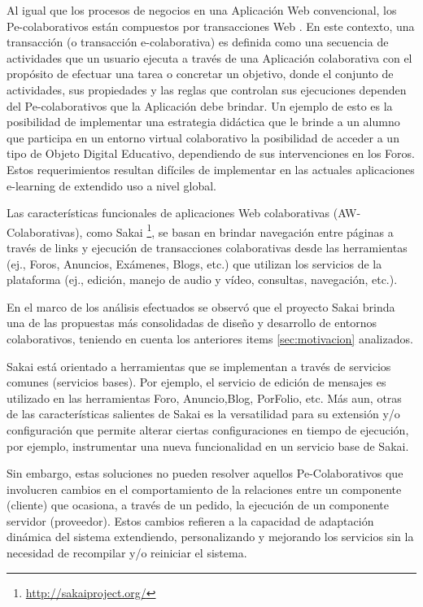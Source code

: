 {Al igual que los procesos de negocios en una Aplicación Web
convencional, los Pe-colaborativos están compuestos por transacciones Web
\cite{cacic2007.7}. En este contexto, una transacción (o transacción
e-colaborativa) es definida como una secuencia de actividades que un usuario
ejecuta a través de una Aplicación colaborativa con el propósito de efectuar una
tarea o concretar un objetivo, donde el conjunto de actividades, sus propiedades
y las reglas que controlan sus ejecuciones dependen del Pe-colaborativos que la
Aplicación debe brindar. Un ejemplo de esto es la posibilidad de implementar una estrategia didáctica que le brinde a un alumno que participa en un entorno virtual colaborativo la posibilidad de acceder a un tipo de Objeto Digital Educativo, dependiendo de sus intervenciones en los Foros. 
Estos requerimientos resultan difíciles de implementar en las actuales aplicaciones e-learning de
extendido uso a nivel global.

Las características funcionales de aplicaciones Web
colaborativas (AW-Colaborativas), como
Sakai \footnote{\url{http://sakaiproject.org/}}, se basan en brindar
navegación entre páginas a través de links y ejecución de transacciones
colaborativas  desde las herramientas (ej., Foros, Anuncios, Exámenes, Blogs,
etc.) que utilizan los servicios de la plataforma (ej., edición, manejo de audio
y vídeo, consultas, navegación, etc.).

En el marco de los análisis efectuados se observó que el proyecto Sakai
brinda una de las propuestas más consolidadas de diseño y desarrollo de
entornos colaborativos, teniendo en cuenta los anteriores items
\ref{sec:motivacion} analizados.

Sakai está orientado a herramientas que se implementan a través de servicios
comunes (servicios bases). Por ejemplo, el servicio de edición de mensajes es
utilizado en las herramientas Foro, Anuncio,Blog, PorFolio, etc. Más aun, otras
de las características salientes de Sakai es la versatilidad para su extensión
y/o configuración que permite alterar ciertas configuraciones  en
tiempo de ejecución, por ejemplo, instrumentar una nueva funcionalidad en un
servicio base de Sakai.

Sin embargo, estas soluciones no pueden resolver aquellos Pe-Colaborativos que
involucren cambios en el comportamiento de la relaciones entre un componente
(cliente) que ocasiona, a través de un pedido, la ejecución de un componente
servidor (proveedor). Estos cambios refieren a la capacidad de
adaptación dinámica del sistema \cite{cacic2007.14} extendiendo, personalizando
y mejorando los servicios sin la necesidad de recompilar y/o reiniciar el
sistema. 

}
